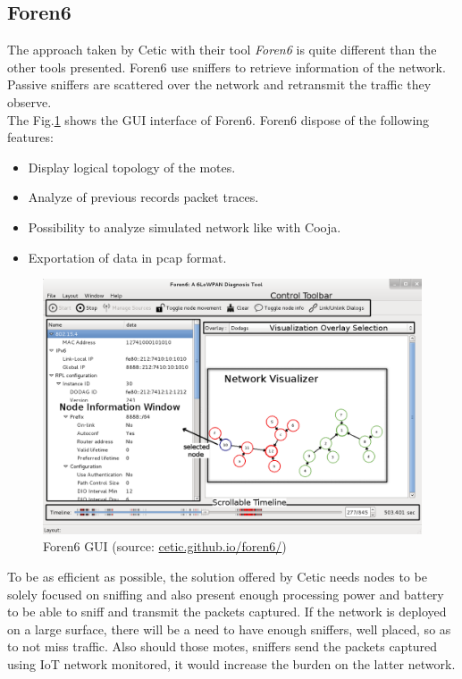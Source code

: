 \subsection{Foren6}

The approach taken by Cetic with their tool \textit{Foren6} \cite{website:foren6} is quite different than the other tools presented. Foren6 use sniffers to retrieve information of the network. Passive sniffers are scattered over the network and retransmit the traffic they observe. \\

The Fig.\ref{fig:foren6} shows the GUI interface of Foren6. Foren6 dispose of the following features:
\begin{itemize}
  \item Display logical topology of the motes.
  \item Analyze of previous records packet traces.
  \item Possibility to analyze simulated network like with Cooja.
  \item Exportation of data in pcap format. \\
\end{itemize}

\begin{figure}
  \centering
  \includegraphics[width=\textwidth]{res/foren6.png}
  \caption{Foren6 GUI (source: \url{cetic.github.io/foren6/})}
  \label{fig:foren6}
\end{figure}

To be as efficient as possible, the solution offered by Cetic needs nodes to be solely focused on sniffing and also present enough processing power and battery to be able to sniff and transmit the packets captured. If the network is deployed on a large surface, there will be a need to have enough sniffers, well placed, so as to not miss traffic. Also should those motes, sniffers send the packets captured using IoT network monitored, it would increase the burden on the latter network. \\

